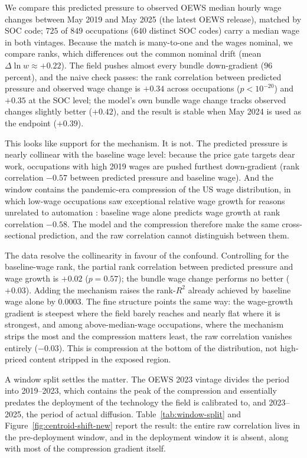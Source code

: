 \documentclass[12pt, a4paper]{article}
\begin{document}
We compare this predicted pressure to observed OEWS median hourly wage
changes between May 2019 and May 2025 (the latest OEWS release), matched
by SOC code; $725$ of $849$ occupations ($640$ distinct SOC codes) carry
a median wage in both vintages. Because the match is many-to-one and the
wages nominal, we compare ranks, which differences out the common
nominal drift (mean $\Delta\ln w\approx+0.22$). The field pushes almost
every bundle down-gradient ($96$ percent), and the naive check passes:
the rank correlation between predicted pressure and observed wage change
is $+0.34$ across occupations ($p<10^{-20}$) and $+0.35$ at the SOC
level; the model's own bundle wage change tracks observed changes
slightly better ($+0.42$), and the result is stable when May 2024 is
used as the endpoint ($+0.39$).

This looks like support for the mechanism. It is not. The predicted pressure is nearly collinear with the
baseline wage level: because the price gate targets dear work,
occupations with high 2019 wages are pushed furthest down-gradient (rank
correlation $-0.57$ between predicted pressure and baseline wage). And
the window contains the pandemic-era compression of the US wage
distribution, in which low-wage occupations saw exceptional relative
wage growth for reasons unrelated to automation
\parencite{autor2023compression}: baseline wage alone predicts wage
growth at rank correlation $-0.58$. The model and the compression
therefore make the same cross-sectional prediction, and the raw
correlation cannot distinguish between them.

The data resolve the collinearity in favour of the confound. Controlling
for the baseline-wage rank, the partial rank correlation between
predicted pressure and wage growth is $+0.02$ ($p=0.57$); the bundle
wage change performs no better ($+0.03$). Adding the mechanism raises
the rank-$R^2$ already achieved by baseline wage alone by $0.0003$. The
fine structure points the same way: the wage-growth gradient is
steepest where the field barely reaches and nearly flat where it is
strongest, and among above-median-wage occupations, where the mechanism
strips the most and the compression matters least, the raw correlation
vanishes entirely ($-0.03$). This is compression at the bottom of the
distribution, not high-priced content stripped in the exposed
region.

A window split settles the matter. The OEWS 2023 vintage divides the
period into 2019--2023, which contains the peak of the compression and
essentially predates the deployment of the technology the field is
calibrated to, and 2023--2025, the period of actual diffusion.
Table~\ref{tab:window-split} and Figure~\ref{fig:centroid-shift-new}
report the result: the entire raw
correlation lives in the pre-deployment window, and in the deployment
window it is absent, along with most of the compression gradient itself.
\end{document}
